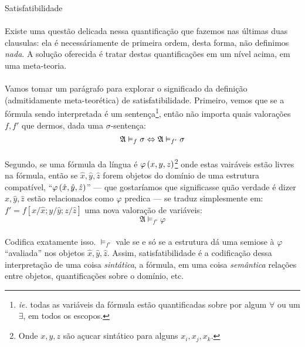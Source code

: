 \begin{definition}{Satisfatibilidade}
            \paragraph{}
                Existe uma questão delicada nessa quantificação
                que fazemos nas últimas duas clausulas: ela é 
                necessáriamente de primeira ordem, desta forma,
                não definimos {\em nada}. A solução oferecida é
                tratar destas quantificações em um nível acima, 
                em uma meta-teoria.
        \end{definition}

        \paragraph{}
            Vamos tomar um parágrafo para explorar o significado 
            da definição (admitidamente meta-teorética) de 
            satisfatibilidade. Primeiro, vemos que se a fórmula 
            sendo interpretada é um sentença\footnote{{\em ie.} 
            todas as variáveis da fórmula estão quantificadas 
            sobre por algum $\forall$ ou um $\exists$, em todos 
            os escopos.}, então não importa quais valorações $f,
            f'$ que dermos, dada uma $\sigma$-sentença:
            $$ \mathfrak{A}\vDash_{f} \sigma \Leftrightarrow \mathfrak{A}\vDash_{f'} \sigma $$
        \paragraph{}
            Segundo, se uma fórmula da língua é $\varphi\POINT{x}{y}{z}$\footnote{
            Onde $x,y,z$ são açucar sintático para alguns $x_i, 
            x_j, x_k$.} onde estas vairáveis estão livres na 
            fórmula, então se $\hat{x}, \hat{y}, \hat{z}$ forem
            objetos do domínio de uma estrutura compatível, 
            ``$\varphi\POINT{\hat{x}}{\hat{y}}{\hat{z}}$'' ---
            que gostaríamos que significasse quão verdade é dizer 
            $\hat{x}, \hat{y}, \hat{z}$ estão relacionados como
            $\varphi$ predica --- se traduz simplesmente em:
            $f'=f[x\slash\hat x; y\slash\hat y; z\slash\hat z]$
            uma nova valoração de variáveis:
            $$ \mathfrak{A}\vDash_{f'} \varphi $$
        \paragraph{}
            Codifica exatamente isso. $\vDash_{f'}$ vale se e só
            se a estrutura dá uma semiose à $\varphi$ ``avaliada''
            nos objetos $\hat{x},\hat{y},\hat{z}$. Assim, 
            satisfatibilidade é a codificação dessa interpretação 
            de uma coisa {\em sintática}, a fórmula, em uma coisa 
            {\em semântica} relações entre objetos, quantificações 
            sobre o domínio, etc.
